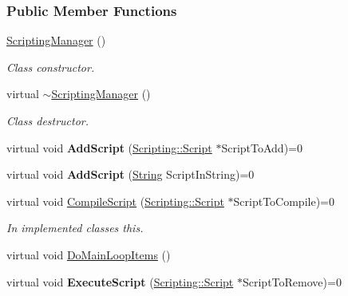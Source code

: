 \subsubsection*{Public Member Functions}
\begin{DoxyCompactItemize}
\item 
\hyperlink{classMezzanine_1_1ScriptingManager_a41b5cfe0b77fcf5fc68e1e4771cbdd6f}{ScriptingManager} ()
\begin{DoxyCompactList}\small\item\em Class constructor. \item\end{DoxyCompactList}\item 
\hypertarget{classMezzanine_1_1ScriptingManager_ab02a893a15e451624263c892928a88b8}{
virtual \hyperlink{classMezzanine_1_1ScriptingManager_ab02a893a15e451624263c892928a88b8}{$\sim$ScriptingManager} ()}
\label{classMezzanine_1_1ScriptingManager_ab02a893a15e451624263c892928a88b8}

\begin{DoxyCompactList}\small\item\em Class destructor. \item\end{DoxyCompactList}\item 
\hypertarget{classMezzanine_1_1ScriptingManager_add2d6f76c421430823439c4f08981f05}{
virtual void {\bfseries AddScript} (\hyperlink{classMezzanine_1_1Scripting_1_1Script}{Scripting::Script} $\ast$ScriptToAdd)=0}
\label{classMezzanine_1_1ScriptingManager_add2d6f76c421430823439c4f08981f05}

\item 
\hypertarget{classMezzanine_1_1ScriptingManager_a5948df253d38dcce74ddb914719300ad}{
virtual void {\bfseries AddScript} (\hyperlink{namespaceMezzanine_acf9fcc130e6ebf08e3d8491aebcf1c86}{String} ScriptInString)=0}
\label{classMezzanine_1_1ScriptingManager_a5948df253d38dcce74ddb914719300ad}

\item 
\hypertarget{classMezzanine_1_1ScriptingManager_a7bf35da7b8088d0c3a19e8f75a75e68e}{
virtual void \hyperlink{classMezzanine_1_1ScriptingManager_a7bf35da7b8088d0c3a19e8f75a75e68e}{CompileScript} (\hyperlink{classMezzanine_1_1Scripting_1_1Script}{Scripting::Script} $\ast$ScriptToCompile)=0}
\label{classMezzanine_1_1ScriptingManager_a7bf35da7b8088d0c3a19e8f75a75e68e}

\begin{DoxyCompactList}\small\item\em In implemented classes this. \item\end{DoxyCompactList}\item 
virtual void \hyperlink{classMezzanine_1_1ScriptingManager_a82c560b4d99f6df817866e1a5ae7f947}{DoMainLoopItems} ()
\item 
\hypertarget{classMezzanine_1_1ScriptingManager_a47d1b5a899cf4ce5e6a50256aa16f7de}{
virtual void {\bfseries ExecuteScript} (\hyperlink{classMezzanine_1_1Scripting_1_1Script}{Scripting::Script} $\ast$ScriptToRemove)=0}
\label{classMezzanine_1_1ScriptingManager_a47d1b5a899cf4ce5e6a50256aa16f7de}


\end{DoxyCompactItemize}
